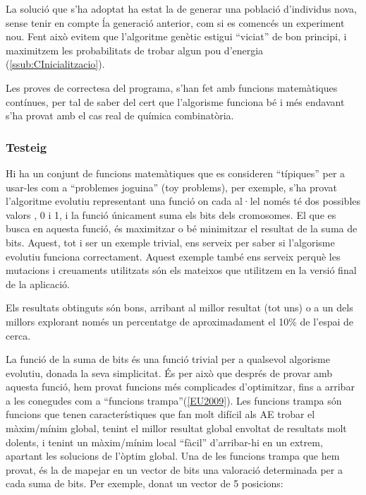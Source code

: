 La solució que s'ha adoptat ha estat la de generar una població d'individus
nova, sense tenir en compte ĺa generació anterior, com si es comencés un
experiment nou.  Fent això evitem que l'algoritme genètic estigui ``viciat'' de
bon principi, i maximitzem les probabilitats de trobar algun pou d'energia
(\ref{ssub:CInicialitzacio}).

Les proves de correctesa del programa, s'han fet amb funcions matemàtiques
contínues, per tal de saber del cert que l'algorisme funciona bé i més endavant
s'ha provat amb el cas real de química combinatòria.


\subsubsection{Testeig} %
\label{ssub:Testeig}

Hi ha un conjunt de funcions matemàtiques que es consideren ``típiques'' per a
usar-les com a ``problemes joguina'' (toy problems), per exemple, s'ha provat
l'algoritme evolutiu representant una funció on cada al·lel només té dos
possibles valors , 0 i 1, i la funció únicament suma els bits dels cromosomes.
El que es busca en aquesta funció, és maximitzar o bé minimitzar el resultat de
la suma de bits.  Aquest, tot i ser un exemple trivial, ens serveix per
saber si l'algorisme evolutiu funciona correctament.  Aquest exemple també ens
serveix perquè les mutacions i creuaments utilitzats són els mateixos que
utilitzem en la versió final de la aplicació.

Els resultats obtinguts són bons, arribant al millor resultat (tot uns) o a un
dels millors explorant només un percentatge de aproximadament el  10\% de
l'espai de cerca.

La funció de la suma de bits és una funció trivial per a qualsevol algorisme
evolutiu, donada la seva simplicitat.  És per això que després de provar amb
aquesta funció, hem provat funcions més complicades d'optimitzar, fins a arribar a
les conegudes com a ``funcions trampa''(\ref{EU2009}).  Les funcions trampa són funcions que
tenen característiques que fan molt difícil als AE trobar el màxim/mínim global,
tenint el millor resultat global envoltat de resultats molt dolents, i tenint un
màxim/mínim local ``fàcil'' d'arribar-hi en un extrem, apartant les solucions de
l'òptim global.  Una de les funcions trampa que hem provat, és la de mapejar en
un vector de bits una valoració determinada per a cada suma de bits.  Per
exemple, donat un vector de 5 posicions:


